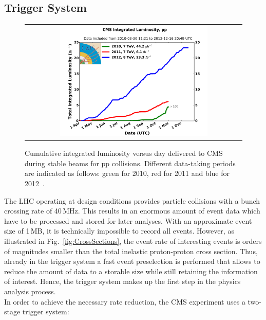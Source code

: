 \subsection{Trigger System}
\label{subsec:cms_trigger}
\begin{figure}[!t]
  \centering
  \begin{tabular}{c}
    \includegraphics[width=0.7\textwidth]{figures/int_lumi_cumulative_pp_2.pdf}
  \end{tabular}
  \caption{Cumulative integrated luminosity versus day delivered to CMS during stable beams for pp collisions. Different data-taking periods are indicated as follows: green for 2010, red for 2011 and blue for 2012~\cite{bib:lhc:lumi12}.}
  \label{fig:lhc_data}
\end{figure}
The LHC operating at design conditions provides particle collisions with a bunch crossing rate of 40\,MHz. This results in an enormous amount of event data which have to be processed and stored for later analyses. With an approximate event size of 1\,MB, it is technically impossible to record all events. However, as illustrated in Fig.~\ref{fig:CrossSections}, the event rate of interesting events is orders of magnitudes smaller than the total inelastic proton-proton cross section. Thus, already in the trigger system a fast event preselection is performed that allows to reduce the amount of data to a storable size while still retaining the information of interest. Hence, the trigger system makes up the first step in the physics analysis process.\\
In order to achieve the necessary rate reduction, the CMS experiment uses a two-stage trigger system:
